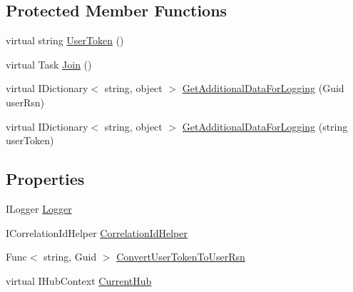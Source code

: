 \subsection*{Protected Member Functions}
\begin{DoxyCompactItemize}
\item 
virtual string \hyperlink{classCqrs_1_1WebApi_1_1SignalR_1_1Hubs_1_1NotificationHub_a649436109e0060be9224aff8e75986b4_a649436109e0060be9224aff8e75986b4}{User\+Token} ()
\item 
virtual Task \hyperlink{classCqrs_1_1WebApi_1_1SignalR_1_1Hubs_1_1NotificationHub_ae5915026e53a6d7b9929f703688ce90c_ae5915026e53a6d7b9929f703688ce90c}{Join} ()
\item 
virtual I\+Dictionary$<$ string, object $>$ \hyperlink{classCqrs_1_1WebApi_1_1SignalR_1_1Hubs_1_1NotificationHub_a4b662758eb3732be37b9702c8d4e1791_a4b662758eb3732be37b9702c8d4e1791}{Get\+Additional\+Data\+For\+Logging} (Guid user\+Rsn)
\item 
virtual I\+Dictionary$<$ string, object $>$ \hyperlink{classCqrs_1_1WebApi_1_1SignalR_1_1Hubs_1_1NotificationHub_a4c2512231d4ad5975fa584b14c2974c3_a4c2512231d4ad5975fa584b14c2974c3}{Get\+Additional\+Data\+For\+Logging} (string user\+Token)
\end{DoxyCompactItemize}
\subsection*{Properties}
\begin{DoxyCompactItemize}
\item 
I\+Logger \hyperlink{classCqrs_1_1WebApi_1_1SignalR_1_1Hubs_1_1NotificationHub_a94a46d2beddc12c3920b33b53e579d36_a94a46d2beddc12c3920b33b53e579d36}{Logger}
\item 
I\+Correlation\+Id\+Helper \hyperlink{classCqrs_1_1WebApi_1_1SignalR_1_1Hubs_1_1NotificationHub_aa65bf9c3c24588f4c36522fe7f911949_aa65bf9c3c24588f4c36522fe7f911949}{Correlation\+Id\+Helper}
\item 
Func$<$ string, Guid $>$ \hyperlink{classCqrs_1_1WebApi_1_1SignalR_1_1Hubs_1_1NotificationHub_a255a9ddc4f274cab0eae62e827f3726a_a255a9ddc4f274cab0eae62e827f3726a}{Convert\+User\+Token\+To\+User\+Rsn}
\item 
virtual I\+Hub\+Context \hyperlink{classCqrs_1_1WebApi_1_1SignalR_1_1Hubs_1_1NotificationHub_a27c6b1d7673af05bab0305e00aef9be7_a27c6b1d7673af05bab0305e00aef9be7}{Current\+Hub}
\end{DoxyCompactItemize}


